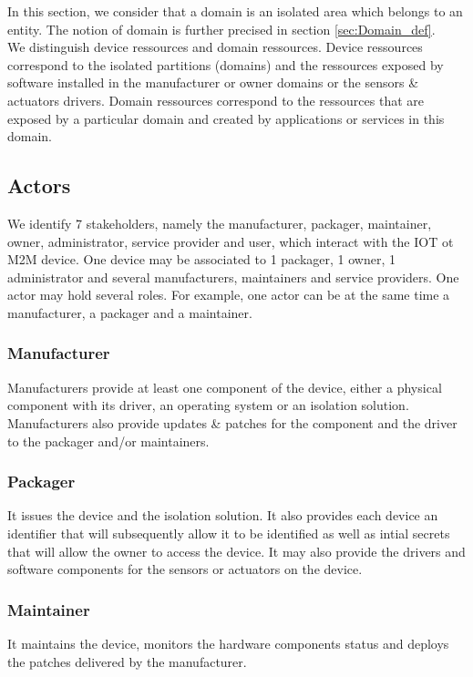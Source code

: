 \documentclass[conference]{IEEEtran}
\begin{document}
In this section, we consider that a domain is an isolated area which belongs to an entity. The notion of domain is further precised in section \ref{sec:Domain_def}.\\

We distinguish device ressources and domain ressources. Device ressources correspond to the isolated partitions (domains) and the ressources exposed by software installed in the manufacturer or owner domains or the sensors \& actuators drivers. Domain ressources correspond to the ressources that are exposed by a particular domain and created by applications or services in this domain.\\

\subsection{Actors}
\label{sec:Actors}
We identify 7 stakeholders, namely the manufacturer, packager, maintainer, owner, administrator, service provider and user, which interact with the IOT ot M2M device. One device may be associated to 1 packager, 1 owner, 1 administrator and several manufacturers, maintainers and service providers. One actor may hold several roles. For example, one actor can be at the same time a manufacturer, a packager and a maintainer.
\subsubsection{Manufacturer}
Manufacturers provide at least one component of the device, either a physical component with its driver, an operating system or an isolation solution. Manufacturers also provide updates \& patches for the component and the driver to the packager and/or maintainers. 
\subsubsection{Packager}
It issues the device and the isolation solution. It also provides each device an identifier that will subsequently allow it to be identified as well as intial secrets that will allow the owner to access the device. It may also provide the drivers and software components for the sensors or actuators on the device. 
\subsubsection{Maintainer}
It maintains the device, monitors the hardware components status and deploys the patches delivered by the manufacturer. 
\end{document}

